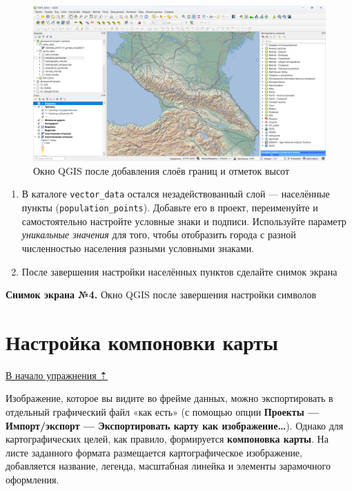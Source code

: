 \documentclass[
  12pt,
]{book}
\begin{document}
\begin{figure}
\centering
\includegraphics{images/Ex01_MapGeneral/screen_qgis_points.png}
\caption{Окно QGIS после добавления слоёв границ и отметок высот}
\end{figure}

\begin{enumerate}
\def\labelenumi{\arabic{enumi}.}
\setcounter{enumi}{7}
\item
  В каталоге \texttt{vector\_data} остался незадействованный слой --- населённые пункты (\texttt{population\_points}). Добавьте его в проект, переименуйте и самостоятельно настройте условные знаки и подписи. Используйте параметр \emph{уникальные значения} для того, чтобы отобразить города с разной численностью населения разными условными знаками.
\item
  После завершения настройки населённых пунктов сделайте снимок экрана
\end{enumerate}

\textbf{Снимок экрана №4.} Окно QGIS после завершения настройки символов

\hypertarget{map-design-general-layout}{%
\section{Настройка компоновки карты}\label{map-design-general-layout}}

\protect\hyperlink{map-design-general}{В начало упражнения ⇡}

Изображение, которое вы видите во фрейме данных, можно экспортировать в отдельный графический файл «как есть» (с помощью опции \textbf{Проекты --- Импорт/экспорт --- Экспортировать карту как изображение\ldots{}}). Однако для картографических целей, как правило, формируется \textbf{компоновка карты}. На листе заданного формата размещается картографическое изображение, добавляется название, легенда, масштабная линейка и элементы зарамочного оформления.
\end{document}

